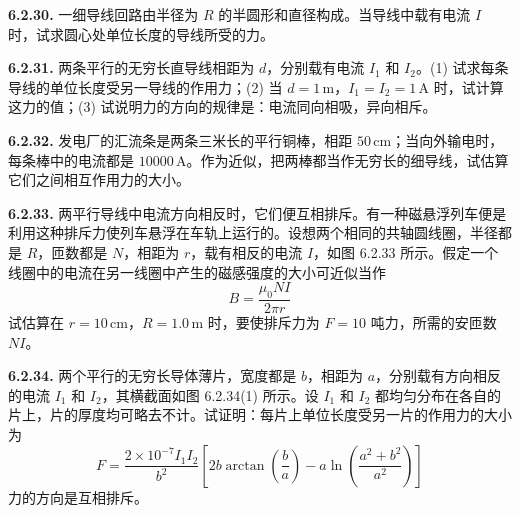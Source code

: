 \vfill
\newpage

\textbf{6.2.30.} 一细导线回路由半径为 $R$ 的半圆形和直径构成。当导线中载有电流 $I$ 时，试求圆心处单位长度的导线所受的力。

\vfill
\newpage

\textbf{6.2.31.} 两条平行的无穷长直导线相距为 $d$，分别载有电流 $I_{1}$ 和 $I_{2}$。(1) 试求每条导线的单位长度受另一导线的作用力；(2) 当 $d = 1\,\mathrm{m}$，$I_{1} = I_{2} = 1\,\mathrm{A}$ 时，试计算这力的值；(3) 试说明力的方向的规律是：电流同向相吸，异向相斥。

\begin{center}
\end{center}

\vfill
\newpage

\textbf{6.2.32.} 发电厂的汇流条是两条三米长的平行铜棒，相距 $50\,\mathrm{cm}$；当向外输电时，每条棒中的电流都是 $10000\,\mathrm{A}$。作为近似，把两棒都当作无穷长的细导线，试估算它们之间相互作用力的大小。

\vfill
\newpage

\textbf{6.2.33.} 两平行导线中电流方向相反时，它们便互相排斥。有一种磁悬浮列车便是利用这种排斥力使列车悬浮在车轨上运行的。设想两个相同的共轴圆线圈，半径都是 $R$，匝数都是 $N$，相距为 $r$，载有相反的电流 $I$，如图 6.2.33 所示。假定一个线圈中的电流在另一线圈中产生的磁感强度的大小可近似当作
\[
B = \frac{\mu_{0} N I}{2\pi r}
\]
试估算在 $r = 10\,\mathrm{cm}$，$R = 1.0\,\mathrm{m}$ 时，要使排斥力为 $F = 10$ 吨力，所需的安匝数 $NI$。

\begin{center}
\end{center}

\vfill
\newpage

\textbf{6.2.34.} 两个平行的无穷长导体薄片，宽度都是 $b$，相距为 $a$，分别载有方向相反的电流 $I_{1}$ 和 $I_{2}$，其横截面如图 6.2.34(1) 所示。设 $I_{1}$ 和 $I_{2}$ 都均匀分布在各自的片上，片的厚度均可略去不计。试证明：每片上单位长度受另一片的作用力的大小为
\[
F = \frac{2 \times 10^{-7} I_{1} I_{2}}{b^{2}} \left[ 2b \arctan\left(\frac{b}{a}\right) - a \ln\left(\frac{a^{2} + b^{2}}{a^{2}}\right) \right]
\]
力的方向是互相排斥。

\begin{center}
\end{center}

\vfill
\newpage

